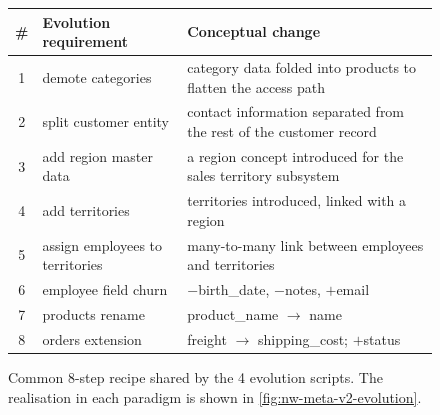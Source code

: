   \begin{figure}[htbp]
  \centering
  \footnotesize
  \begin{tabularx}{\textwidth}{@{}c l X@{}}
  \toprule
  \textbf{\#} & \textbf{Evolution requirement} & \textbf{Conceptual change} \\
  \midrule
  1 & demote categories          & category data folded into products to flatten the access path \\
  2 & split customer entity      & contact information separated from the rest of the customer record \\
  3 & add region master data     & a region concept introduced for the sales territory subsystem \\
  4 & add territories            & territories introduced, linked with a region \\
  5 & assign employees to territories & many-to-many link between employees and territories \\
  6 & employee field churn       & $-$birth\_date, $-$notes, $+$email \\
  7 & products rename            & product\_name $\to$ name \\
  8 & orders extension           & freight $\to$ shipping\_cost; $+$status \\
  \bottomrule
  \end{tabularx}
  \caption{Common 8-step recipe shared by the 4 evolution scripts. The realisation in each paradigm is shown in \autoref{fig:nw-meta-v2-evolution}.}
  \label{fig:nw-meta-v2-evolution-recipe}
  \end{figure}

